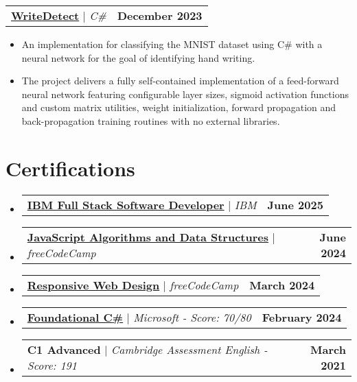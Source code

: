 \documentclass[letterpaper,11pt]{article}
\makeatletter
\newcommand{\resumeItem}[1]{
  \item\small{
    {#1 \vspace{-2pt}}
  }
}
\newcommand{\resumeProjectHeading}[2]{
    \item
    \begin{tabular*}{1.001\textwidth}{l@{\extracolsep{\fill}}r}
      \small#1 & \textbf{\small #2}\\
    \end{tabular*}\vspace{-7pt}
}
\newcommand{\resumeSubHeadingListStart}{\begin{itemize}[leftmargin=0.0in, label={}]}
\newcommand{\resumeSubHeadingListEnd}{\end{itemize}}
\newcommand{\resumeItemListStart}{\begin{itemize}}
\newcommand{\resumeItemListEnd}{\end{itemize}\vspace{-5pt}}
\makeatother
\begin{document}
\vspace{-15pt}
      \resumeProjectHeading
          {\textbf{\href{https://github.com/BogdanBargaoanu/WriteDetect}{WriteDetect}} $|$ \emph{\mbox{C{\#}}}}{December 2023}
          \resumeItemListStart
            \resumeItem{An implementation for classifying the MNIST dataset using \mbox{C{\#}} with a neural network for the goal of identifying hand writing.}
            \resumeItem{The project delivers a fully self-contained implementation of a feed-forward neural network featuring configurable layer sizes, sigmoid activation functions and custom matrix utilities, weight initialization, forward propagation and back-propagation training routines with no external libraries.}
          \resumeItemListEnd 
 \vspace{-5pt}




\section{Certifications}
    \resumeSubHeadingListStart
      \resumeProjectHeading
          {\textbf{\href{https://coursera.org/verify/professional-cert/BIP07DN5KMY3}{IBM Full Stack Software Developer}} $|$ \emph{IBM}}{June 2025}
          \vspace{-20pt}
      \resumeProjectHeading
          {\textbf{\href{https://www.freecodecamp.org/certification/BogdanBargaoanu/javascript-algorithms-and-data-structures-v8}{JavaScript Algorithms and Data Structures}} $|$ \emph{freeCodeCamp}}{June 2024}
          \vspace{-20pt}
      \resumeProjectHeading
          {\textbf{\href{https://www.freecodecamp.org/certification/BogdanBargaoanu/responsive-web-design}{Responsive Web Design}} $|$ \emph{freeCodeCamp}}{March 2024}
          \vspace{-20pt}
      \resumeProjectHeading
          {\textbf{\href{https://www.freecodecamp.org/certification/BogdanBargaoanu/foundational-c-sharp-with-microsoft}{Foundational \mbox{C{\#}}}} $|$ \emph{Microsoft - Score: 70/80}}{February 2024}
          \vspace{-20pt}
      \resumeProjectHeading
          {\textbf{C1 Advanced} $|$ \emph{Cambridge Assessment English - Score: 191}}{March 2021}
    \resumeSubHeadingListEnd
\end{document}
